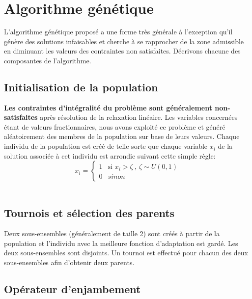\vspace*{1.2cm}



\section{Algorithme génétique}

L'algorithme génétique proposé a une forme très générale à l'exception qu'il génère 
des solutions infaisables et cherche à se rapprocher de la zone admissible en diminuant
les valeurs des contraintes non satisfaites. Décrivons chacune des composantes de l'algorithme.

\subsection{Initialisation de la population}

\textbf{Les contraintes d'intégralité du problème sont généralement non-satisfaites} après résolution
de la relaxation linéaire. Les variables concernées étant de valeurs fractionnaires,
nous avons exploité ce problème et généré aléatoirement des membres de la population
sur base de leurs valeurs. Chaque individu de la population est créé de telle sorte que chaque variable
$x_i$ de la solution associée à cet individu est arrondie suivant cette simple règle:
\begin{equation}
x_i =
\begin{cases}
  1 & \text{si } x_i > \zeta \ , \ \zeta \sim U(0, 1) \\
  0 & sinon
\end{cases}       
\end{equation} \\

\subsection{Tournois et sélection des parents}

Deux sous-ensembles (généralement de taille 2) sont créés à partir de la population
et l'individu avec la meilleure fonction d'adaptation est gardé.
Les deux sous-ensembles sont disjoints. Un tournoi est effectué pour chacun des deux
sous-ensembles afin d'obtenir deux parents.

\subsection{Opérateur d'enjambement}


